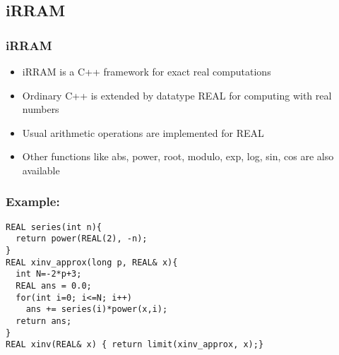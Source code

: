 \subsection{iRRAM}
\begin{frame}[<+->]
\frametitle{iRRAM}
\begin{itemize}[<+->]
\item iRRAM is a C++ framework for exact real computations
\item Ordinary C++ is extended by datatype REAL for computing with real numbers
\item Usual arithmetic operations are implemented for REAL
\item Other functions like abs, power, root, modulo, exp, log, sin, cos are also available
\end{itemize}
\end{frame}
\begin{frame}[<+->][fragile]
\frametitle{Example: \irram}
\begin{example}
\begin{lstlisting}
REAL series(int n){
  return power(REAL(2), -n);
}
REAL xinv_approx(long p, REAL& x){
  int N=-2*p+3;
  REAL ans = 0.0;
  for(int i=0; i<=N; i++)
    ans += series(i)*power(x,i);
  return ans;
}
REAL xinv(REAL& x) { return limit(xinv_approx, x);}
\end{lstlisting}
\end{example}
\end{frame}
